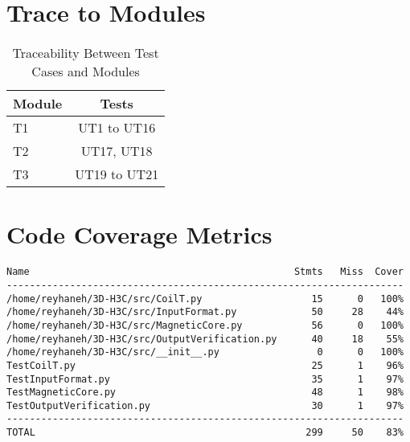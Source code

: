 \documentclass[12pt, titlepage]{article}
\begin{document}
\section{Trace to Modules}		
\begin{table}[H]
  \centering
  \caption{Traceability Between Test Cases and Modules}
  \vspace{3mm}
  \label{tab:my-table}
  \begin{tabular}{l|c}
  Module         & Tests \\ \hline
T1 & UT1 to UT16\\
T2 & UT17, UT18\\
T3 &  UT19 to UT21\\
\end{tabular}
\end{table}
\section{Code Coverage Metrics}
\begin{small}
\begin{verbatim}
Name                                              Stmts   Miss  Cover
---------------------------------------------------------------------
/home/reyhaneh/3D-H3C/src/CoilT.py                   15      0   100%
/home/reyhaneh/3D-H3C/src/InputFormat.py             50     28    44%
/home/reyhaneh/3D-H3C/src/MagneticCore.py            56      0   100%
/home/reyhaneh/3D-H3C/src/OutputVerification.py      40     18    55%
/home/reyhaneh/3D-H3C/src/__init__.py                 0      0   100%
TestCoilT.py                                         25      1    96%
TestInputFormat.py                                   35      1    97%
TestMagneticCore.py                                  48      1    98%
TestOutputVerification.py                            30      1    97%
---------------------------------------------------------------------
TOTAL                                               299     50    83%

\end{verbatim}
\end{small}


\end{document}
